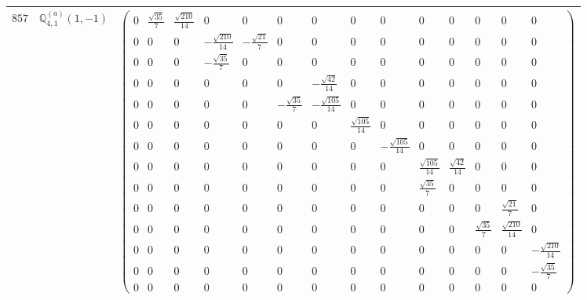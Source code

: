 \documentclass[fleqn,8pt,landscape]{jsarticle}
\begin{document}
\begin{center}
\begin{longtable}{ccc}
$ 857 $ & $ \mathbb{Q}_{4,1}^{(a)}(1,-1) $ & $ \begin{pmatrix} 0 & \frac{\sqrt{35}}{7} & \frac{\sqrt{210}}{14} & 0 & 0 & 0 & 0 & 0 & 0 & 0 & 0 & 0 & 0 & 0 \\ 0 & 0 & 0 & - \frac{\sqrt{210}}{14} & - \frac{\sqrt{21}}{7} & 0 & 0 & 0 & 0 & 0 & 0 & 0 & 0 & 0 \\ 0 & 0 & 0 & - \frac{\sqrt{35}}{7} & 0 & 0 & 0 & 0 & 0 & 0 & 0 & 0 & 0 & 0 \\ 0 & 0 & 0 & 0 & 0 & 0 & - \frac{\sqrt{42}}{14} & 0 & 0 & 0 & 0 & 0 & 0 & 0 \\ 0 & 0 & 0 & 0 & 0 & - \frac{\sqrt{35}}{7} & - \frac{\sqrt{105}}{14} & 0 & 0 & 0 & 0 & 0 & 0 & 0 \\ 0 & 0 & 0 & 0 & 0 & 0 & 0 & \frac{\sqrt{105}}{14} & 0 & 0 & 0 & 0 & 0 & 0 \\ 0 & 0 & 0 & 0 & 0 & 0 & 0 & 0 & - \frac{\sqrt{105}}{14} & 0 & 0 & 0 & 0 & 0 \\ 0 & 0 & 0 & 0 & 0 & 0 & 0 & 0 & 0 & \frac{\sqrt{105}}{14} & \frac{\sqrt{42}}{14} & 0 & 0 & 0 \\ 0 & 0 & 0 & 0 & 0 & 0 & 0 & 0 & 0 & \frac{\sqrt{35}}{7} & 0 & 0 & 0 & 0 \\ 0 & 0 & 0 & 0 & 0 & 0 & 0 & 0 & 0 & 0 & 0 & 0 & \frac{\sqrt{21}}{7} & 0 \\ 0 & 0 & 0 & 0 & 0 & 0 & 0 & 0 & 0 & 0 & 0 & \frac{\sqrt{35}}{7} & \frac{\sqrt{210}}{14} & 0 \\ 0 & 0 & 0 & 0 & 0 & 0 & 0 & 0 & 0 & 0 & 0 & 0 & 0 & - \frac{\sqrt{210}}{14} \\ 0 & 0 & 0 & 0 & 0 & 0 & 0 & 0 & 0 & 0 & 0 & 0 & 0 & - \frac{\sqrt{35}}{7} \\ 0 & 0 & 0 & 0 & 0 & 0 & 0 & 0 & 0 & 0 & 0 & 0 & 0 & 0 \end{pmatrix} $ \\ \hline

\end{longtable}
\end{center}
\end{document}

